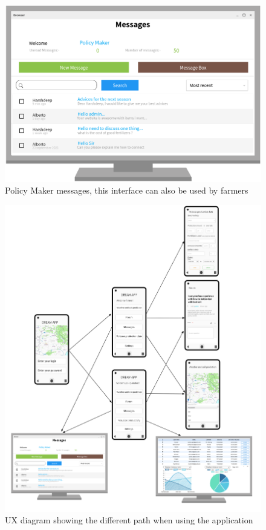 \begin{figure}[H]
	
	\centering
	
	\includegraphics[width=0.8\columnwidth]{Images/messages_policy_maker.png}
	
	\caption{Policy Maker messages, this interface can also be used by farmers}
	
	\label{Fig:interface_messages_policy_maker}
	
\end{figure}

\begin{figure}[H]
	
	\centering
	
	\includegraphics[width=\columnwidth]{Images/ux_diag.png}
	
	\caption{UX diagram showing the different path when using the application}
	
	\label{Fig:diag_ux}
	
\end{figure}